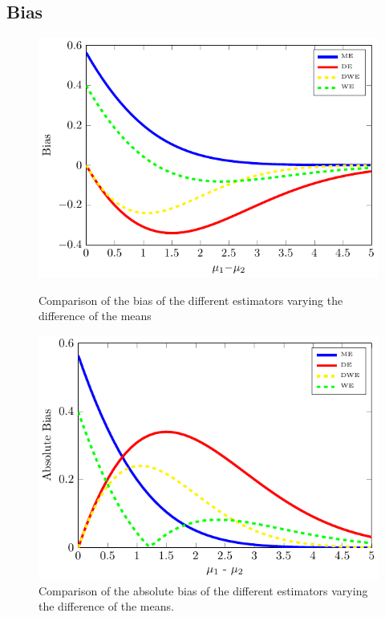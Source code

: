 \subsection{Bias}

\begin{figure}
\centering
	\begin{minipage}{0.45\textwidth}
	\centering
	\includegraphics[scale=0.7]{./img/bias.pdf}
    \caption[Bias analysis in WE]{Comparison of the bias of the different estimators varying the difference of the means}\label{F:bias}
	\end{minipage}
	  \hfill
	\begin{minipage}{0.45\textwidth}
	\centering	
	\includegraphics[scale=0.7]{./img/absolute_bias.pdf}
	\caption[Absolute bias analysis in WE]{Comparison of the absolute bias of the different estimators varying the difference of the means.}\label{F:absolute_bias}
	\end{minipage}
\end{figure}

